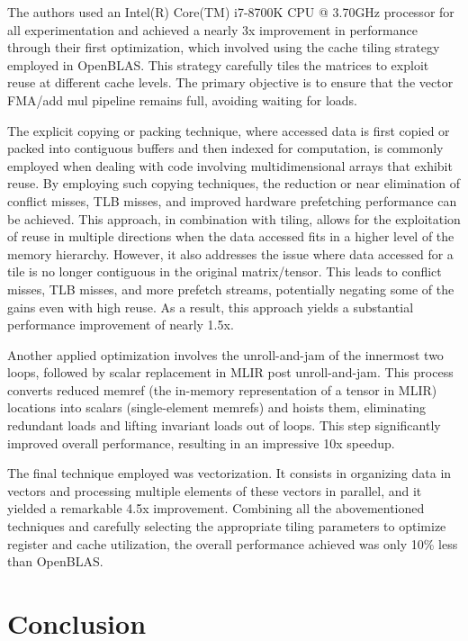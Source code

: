 The authors used an Intel(R) Core(TM) i7-8700K CPU @ 3.70GHz processor for all experimentation and achieved a nearly 3x improvement in performance through their first optimization, which involved using the cache tiling strategy employed in OpenBLAS\@.
This strategy carefully tiles the matrices to exploit reuse at different cache levels.
The primary objective is to ensure that the vector FMA/add mul pipeline remains full, avoiding waiting for loads.

The explicit copying or packing technique, where accessed data is first copied or packed into contiguous buffers and then indexed for computation, is commonly employed when dealing with code involving multidimensional arrays that exhibit reuse.
By employing such copying techniques, the reduction or near elimination of conflict misses, TLB misses, and improved hardware prefetching performance can be achieved.
This approach, in combination with tiling, allows for the exploitation of reuse in multiple directions when the data accessed fits in a higher level of the memory hierarchy.
However, it also addresses the issue where data accessed for a tile is no longer contiguous in the original matrix/tensor.
This leads to conflict misses, TLB misses, and more prefetch streams, potentially negating some of the gains even with high reuse.
As a result, this approach yields a substantial performance improvement of nearly 1.5x.

Another applied optimization involves the unroll-and-jam of the innermost two loops, followed by scalar replacement in MLIR post unroll-and-jam.
This process converts reduced memref (the in-memory representation of a tensor in MLIR) locations into scalars (single-element memrefs) and hoists them, eliminating redundant loads and lifting invariant loads out of loops.
This step significantly improved overall performance, resulting in an impressive 10x speedup.

The final technique employed was vectorization.
It consists in organizing data in vectors and processing multiple elements of these vectors in parallel, and it yielded a remarkable 4.5x improvement.
Combining all the abovementioned techniques and carefully selecting the appropriate tiling parameters to optimize register and cache utilization, the overall performance achieved was only 10\% less than OpenBLAS.

\section{Conclusion}
\label{sec:relater-work-conclusion}


